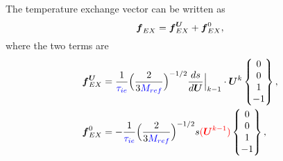 \documentclass[a4paper,10pt]{article}
\newcommand{\bm}[1]{\text{\boldmath$#1$\unboldmath}}
\newcommand{\DiscFunc}[1]{\bm{#1}}
\renewcommand{\u}{\DiscFunc{U}}
\newcommand{\nd}[1]{{\color{blue} #1\color{black}}} %
\newcommand{\fo}[1]{{ \color{red} ( #1 )\color{black} }} %
\def\Mref{\nd{M_{ref}}}
\def\tiea{\nd{\tau_{ie}}}
\begin{document}
The temperature exchange vector can be written as
\[
 \bm{f}_{EX}  = \bm{f}_{EX}^\u + \bm{f}_{EX}^0,
\]
where the two terms are
\begin{align*}
 \bm{f}_{EX}^\u &= \frac{1}{\tiea}\Big(\frac{2}{3  \Mref }\Big)^{-1/2} \frac{d s}{d\u}\Big|_{k-1}\cdot\u^k         \begin{Bmatrix}
                     0 \\
                     0\\
                     1\\
                    -1
       \end{Bmatrix},\\
 \bm{f}_{EX}^0 &= -\frac{1}{\tiea}\Big(\frac{2}{3  \Mref }\Big)^{-1/2} s\fo{\u^{k-1}}         \begin{Bmatrix}
                     0 \\
                     0\\
                     1\\
                    -1
       \end{Bmatrix},\\       
\end{align*}
\end{document}
